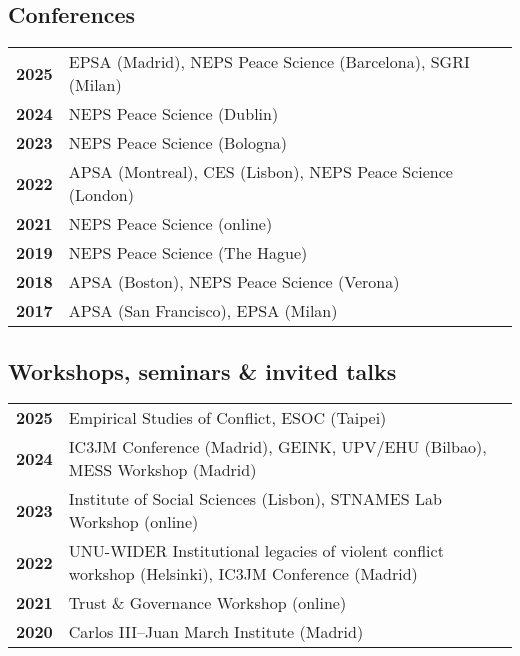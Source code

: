 \documentclass[a4paper, 12pt]{article}
\begin{document}
\subsection*{Conferences}


\begin{tabular}{lp{15cm}}
\textbf{2025} & EPSA (Madrid), NEPS Peace Science (Barcelona), SGRI (Milan) \\
\textbf{2024} & NEPS Peace Science (Dublin) \\
\textbf{2023} & NEPS Peace Science (Bologna) \\
\textbf{2022} & APSA (Montreal), CES (Lisbon), NEPS Peace Science (London) \\
\textbf{2021} & NEPS Peace Science (online) \\
\textbf{2019} & NEPS Peace Science (The Hague) \\
\textbf{2018} & APSA (Boston), NEPS Peace Science (Verona) \\
\textbf{2017} & APSA (San Francisco), EPSA (Milan) \\
\end{tabular}



\subsection*{Workshops, seminars \& invited talks}

\begin{tabular}{lp{15cm}}
\textbf{2025} & Empirical Studies of Conflict, ESOC (Taipei) \\
\textbf{2024} & IC3JM Conference (Madrid), GEINK, UPV/EHU (Bilbao), MESS Workshop (Madrid) \\
\textbf{2023} & Institute of Social Sciences (Lisbon), STNAMES Lab Workshop (online) \\
\textbf{2022} & UNU-WIDER Institutional legacies of violent conflict workshop (Helsinki), IC3JM Conference (Madrid) \\
\textbf{2021} & Trust \& Governance Workshop (online) \\
\textbf{2020} & Carlos III--Juan March Institute (Madrid) \\
\end{tabular}
\end{document}

